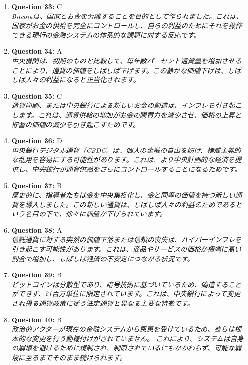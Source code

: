\documentclass[12pt,a4paper]{article}
\begin{document}
\begin{enumerate}
\item \textbf{Question 33:} C
\\ \textit{Bitcoinは、国家とお金を分離することを目的として作られました。これは、国家がお金の供給を完全にコントロールし、自らの利益のためにそれを操作できる現行の金融システムの体系的な課題に対する反応です。}

\item \textbf{Question 34:} A
\\ \textit{中央機関は、初期のものと比較して、毎年数パーセント通貨量を増加させることにより、通貨の価値をしばしば下げます。この静かな価値下げは、しばしば人々の利益になると正当化されます。}

\item \textbf{Question 35:} C
\\ \textit{通貨印刷、または中央銀行による新しいお金の創造は、インフレを引き起こします。これは、通貨供給の増加がお金の購買力を減少させ、価格の上昇と貯蓄の価値の減少を引き起こすためです。}

\item \textbf{Question 36:} D
\\ \textit{中央銀行デジタル通貨（CBDC）は、個人の金融の自由を妨げ、権威主義的な乱用を容易にする可能性があります。これは、より中央計画的な経済を提供し、中央銀行が通貨供給をさらにコントロールすることになるためです。}

\item \textbf{Question 37:} B
\\ \textit{歴史的に、指導者たちは金を中央集権化し、金と同等の価値を持つ新しい通貨を導入しました。この新しい通貨は、しばしば人々の利益のためであるという名目の下で、徐々に価値が下げられています。}

\item \textbf{Question 38:} A
\\ \textit{信託通貨に対する突然の価値下落または信頼の喪失は、ハイパーインフレを引き起こす可能性があります。これは、商品やサービスの価格が極端に高い割合で増加し、しばしば経済の不安定につながる状況です。}

\item \textbf{Question 39:} B
\\ \textit{ビットコインは分散型であり、暗号技術に基づいているため、偽造することができず、21百万単位に限定されています。これは、中央銀行によって変更され得る通貨政策に従う法定通貨と異なる主要な特徴です。}

\item \textbf{Question 40:} B
\\ \textit{政治的アクターが現在の金融システムから恩恵を受けているため、彼らは根本的な変更を行う動機付けがされていません。
これにより、システムは自身の崩壊を避けるために規制され、制限されているにもかかわらず、可能な崩壊に至るまでそのまま続けられます。}


\end{enumerate}
\end{document}

